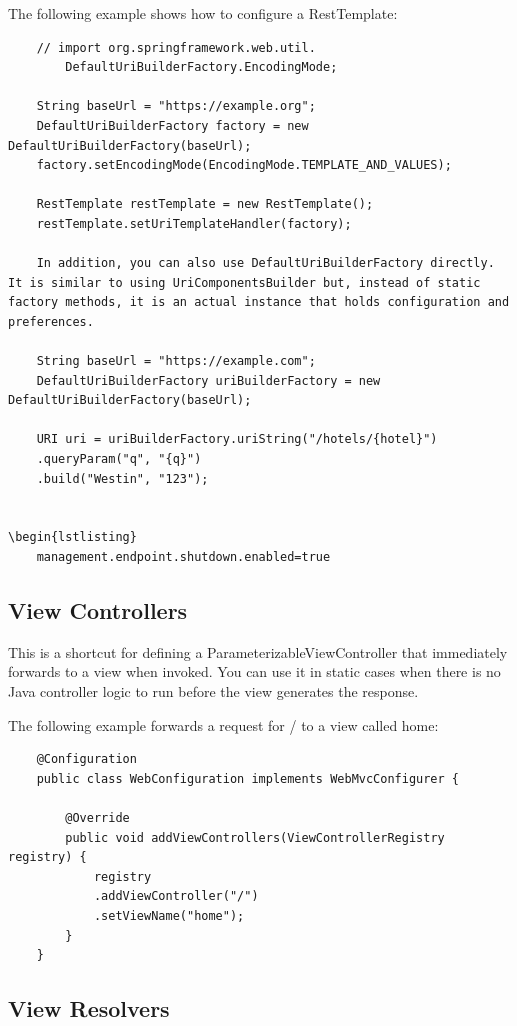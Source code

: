 \documentclass{scrartcl}
\begin{document}
The following example shows how to configure a RestTemplate:
\begin{lstlisting}
    // import org.springframework.web.util.
        DefaultUriBuilderFactory.EncodingMode;

    String baseUrl = "https://example.org";
    DefaultUriBuilderFactory factory = new DefaultUriBuilderFactory(baseUrl);
    factory.setEncodingMode(EncodingMode.TEMPLATE_AND_VALUES);

    RestTemplate restTemplate = new RestTemplate();
    restTemplate.setUriTemplateHandler(factory);

    In addition, you can also use DefaultUriBuilderFactory directly. It is similar to using UriComponentsBuilder but, instead of static factory methods, it is an actual instance that holds configuration and preferences.

    String baseUrl = "https://example.com";
    DefaultUriBuilderFactory uriBuilderFactory = new DefaultUriBuilderFactory(baseUrl);

    URI uri = uriBuilderFactory.uriString("/hotels/{hotel}")
    .queryParam("q", "{q}")
    .build("Westin", "123");


\begin{lstlisting}
    management.endpoint.shutdown.enabled=true
\end{lstlisting}

\subsection{View Controllers}

This is a shortcut for defining a ParameterizableViewController that immediately forwards to a view when invoked. You can use it in static cases when there is no Java controller logic to run before the view generates the response.

The following example forwards a request for / to a view called home:

\begin{lstlisting}
    @Configuration
    public class WebConfiguration implements WebMvcConfigurer {

        @Override
        public void addViewControllers(ViewControllerRegistry registry) {
            registry
            .addViewController("/")
            .setViewName("home");
        }
    }
\end{lstlisting}

\subsection{View Resolvers}
\end{document}
